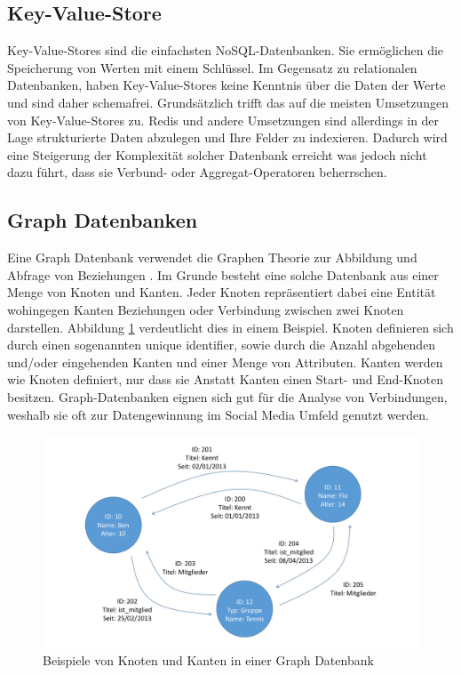 \subsection{Key-Value-Store}
\label{ch:grundlagen:sec:NoSQL:KeyValueStore}

Key-Value-Stores sind die einfachsten NoSQL-Datenbanken. Sie ermöglichen die Speicherung von Werten mit einem Schlüssel. Im Gegensatz zu relationalen Datenbanken, haben Key-Value-Stores keine Kenntnis über die Daten der Werte und sind daher schemafrei. Grundsätzlich trifft das auf die meisten Umsetzungen von Key-Value-Stores zu. Redis und andere Umsetzungen sind allerdings in der Lage strukturierte Daten abzulegen und Ihre Felder zu indexieren. Dadurch wird eine Steigerung der Komplexität solcher Datenbank erreicht was jedoch nicht dazu führt, dass sie Verbund- oder Aggregat-Operatoren beherrschen. 

\subsection{Graph Datenbanken}
\label{ch:grundlagen:sec:NoSQL:GraphDatenbanken}

Eine Graph Datenbank verwendet die Graphen Theorie zur Abbildung und Abfrage von Beziehungen \cite{SWB-386976589}. Im Grunde besteht eine solche Datenbank aus einer Menge von Knoten und Kanten. Jeder Knoten repräsentiert dabei eine Entität wohingegen Kanten Beziehungen oder Verbindung zwischen zwei Knoten darstellen. Abbildung \ref{graph_database} verdeutlicht dies in einem Beispiel. Knoten definieren sich durch einen sogenannten unique identifier, sowie durch die Anzahl abgehenden und/oder eingehenden Kanten  und einer Menge von Attributen. Kanten werden wie Knoten definiert, nur dass sie Anstatt Kanten einen Start- und End-Knoten besitzen. Graph-Datenbanken eignen sich gut für die Analyse von Verbindungen, weshalb sie oft zur Datengewinnung im Social Media Umfeld genutzt werden.

\begin{figure}[H]
	\centering
  \includegraphics[width=1.0\textwidth, width=1.0\textwidth]{pics/graphdatabase.pdf}
	\caption{Beispiele von Knoten und Kanten in einer Graph Datenbank}
	\label{graph_database}
\end{figure}

